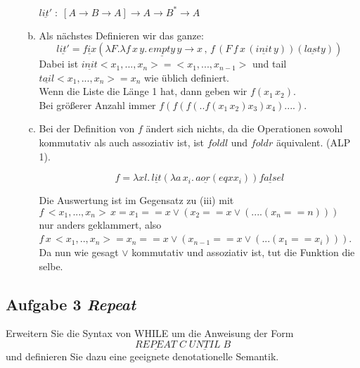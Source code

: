 \documentclass[11pt,a4paper,ngerman]{article}
\begin{document}
\begin{enumerate}[(i)]
\begin{enumerate}[a.]
            $\underline{lit'} \; : \; [A \rightarrow B \rightarrow A] \rightarrow A 
               \rightarrow B^* \rightarrow A$

         \item Als nächstes Definieren wir das ganze:\\
            $$
               \underline{lit'} = \underline{fix} \left( \lambda F. \lambda f \, x \, y .\,
                  \underline{empty} \, y \rightarrow x \, , \, f \, (F \, f \, x \, (\underline{init} \, y))
                     (\underline{last} y)
               \right)
            $$
            Dabei ist $\underline{init} <x_1,...,x_n> = <x_1,...,x_{n-1}>$ und
            tail $\underline{tail} <x_1,...,x_n> = x_n$ wie üblich definiert.\\
            Wenn die Liste die Länge 1 hat, dann geben wir $f (x_1 \, x_2)$.\\
            Bei größerer Anzahl immer $f(f(f(..f(x_1 \, x_2) x_3) x_4) ....)$.
  
         \item Bei der Definition von $f$ ändert sich nichts, da die Operationen sowohl
            kommutativ als auch assoziativ ist, ist $foldl$ und $foldr$ äquivalent. (ALP 1).
            
            $$
               f = \lambda x l. \, \underline{lit}
                  (\lambda a \, x_i. \, a \underline{or} (eq x x_i)) \underline{false} l
            $$

         Die Auswertung ist im Gegensatz zu (iii) mit\\
            $f \, <x_1,...,x_n> \, x= x_1 == x \lor (x_2 == x \lor ( .... (x_n == n)))$\\
         nur anders geklammert, also
            $f \, x \, <x_1,..,x_n> = x_n == x \lor (x_{n-1} == x \lor ( ... (x_1 == x_i)))$.\\
   
         Da nun wie gesagt $\lor$ kommutativ und assoziativ ist, tut die Funktion die selbe.
      \end{enumerate}

\end{enumerate}

\pagebreak

\subsection*{Aufgabe 3 \mdseries\itshape Repeat}

Erweitern Sie die Syntax von WHILE um die Anweisung der Form
$$
   \underline{REPEAT} \; C \; \underline{UNTIL} \; B
$$
und definieren Sie dazu eine geeignete denotationelle Semantik.\\
\end{document}
